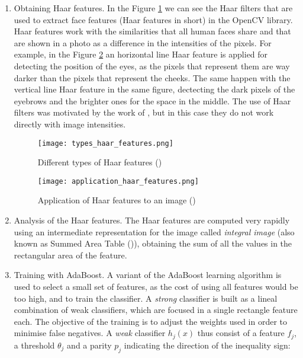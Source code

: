 	\begin{enumerate}
		\item Obtaining Haar features. In the Figure \ref{fig:haar_features} we can see the Haar filters that are used to extract face features (Haar features in short) in the OpenCV library. Haar features work with the similarities that all human faces share and that are shown in a photo as a difference in the intensities of the pixels. For example, in the Figure \ref{fig:application_haar_features} an horizontal line Haar feature is applied for detecting the position of the eyes, as the pixels that represent them are way darker than the pixels that represent the cheeks. The same happen with the vertical line Haar feature in the same figure, dectecting the dark pixels of the eyebrows and the brighter ones for the space in the middle. The use of Haar filters was motivated by the work of \cite{haar_features_before_vj}, but in this case they do not work directly with image intensities. 

		\begin{figure}[h!b]
			\centering
			\texttt{[image: types\_haar\_features.png]}
			\caption{Different types of Haar features (\cite{opencv_haar_cascade_tut})}
			\label{fig:haar_features}
		\end{figure}

		\begin{figure}[h!b]
			\centering
			\texttt{[image: application\_haar\_features.png]}
			\caption{Application of Haar features to an image (\cite{viola2001rapid})}
			\label{fig:application_haar_features}
		\end{figure}

		\item Analysis of the Haar features. The Haar features are computed very rapidly using an intermediate representation for the image called \textit{integral image} (also known as Summed Area Table (\cite{crow_summed_table})), obtaining the sum of all the values in the rectangular area of the feature. 

		\item Training with AdaBoost. A variant of the AdaBoost learning algorithm is used to select a small set of features, as the cost of using all features would be too high, and to train the classifier. A \textit{strong} classifier is built as a lineal combination of weak classifiers, which are focused in a single rectangle feature each. The objective of the training is to adjust the weights used in order to minimise false negatives. A \textit{weak} classifier $h_j(x)$ thus consist of a feature $f_j$, a threshold $\theta_j$ and a parity $p_j$ indicating the direction of the inequality sign:


\end{enumerate}
